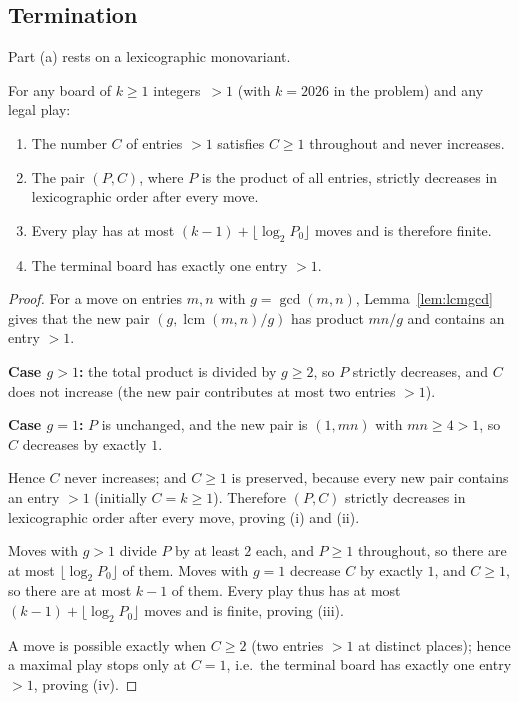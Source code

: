 \documentclass{article}
\DeclareMathOperator{\lcm}{lcm}
\begin{document}
\subsection{Termination}

Part (a) rests on a lexicographic monovariant.

\begin{lemma}\label{lem:term}
For any board of $k\geq 1$ integers~${}>1$ (with $k=2026$ in the problem) and
any legal play:
\begin{enumerate}
\item[(i)] The number $C$ of entries $>1$ satisfies $C\geq 1$ throughout and
           never increases.
\item[(ii)] The pair $(P,C)$, where $P$ is the product of all entries, strictly
            decreases in lexicographic order after every move.
\item[(iii)] Every play has at most $(k-1)+\lfloor\log_2 P_0\rfloor$ moves and
             is therefore finite.
\item[(iv)] The terminal board has exactly one entry $>1$.
\end{enumerate}
\end{lemma}
\begin{proof}
For a move on entries $m,n$ with $g=\gcd(m,n)$, Lemma~\ref{lem:lcmgcd} gives
that the new pair $(g,\lcm(m,n)/g)$ has product $mn/g$ and contains an entry
$>1$.

\textbf{Case $g>1$:} the total product is divided by $g\geq 2$, so $P$ strictly
decreases, and $C$ does not increase (the new pair contributes at most two
entries $>1$).

\textbf{Case $g=1$:} $P$ is unchanged, and the new pair is $(1,mn)$ with
$mn\geq 4>1$, so $C$ decreases by exactly $1$.

Hence $C$ never increases; and $C\geq 1$ is preserved, because every new pair
contains an entry $>1$ (initially $C=k\geq 1$). Therefore $(P,C)$ strictly
decreases in lexicographic order after every move, proving (i) and (ii).

Moves with $g>1$ divide $P$ by at least $2$ each, and $P\geq 1$ throughout, so
there are at most $\lfloor\log_2 P_0\rfloor$ of them. Moves with $g=1$ decrease
$C$ by exactly $1$, and $C\geq 1$, so there are at most $k-1$ of them. Every
play thus has at most $(k-1)+\lfloor\log_2 P_0\rfloor$ moves and is finite,
proving (iii).

A move is possible exactly when $C\geq 2$ (two entries $>1$ at distinct
places); hence a maximal play stops only at $C=1$, i.e.\ the terminal board has
exactly one entry $>1$, proving (iv).
\end{proof}
\end{document}
